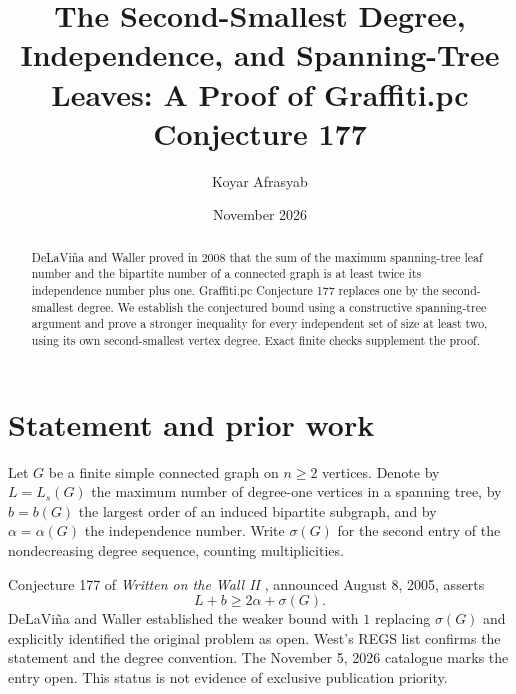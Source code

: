 \documentclass[11pt,a4paper]{article}
\title{The Second-Smallest Degree, Independence, and Spanning-Tree Leaves: A Proof of Graffiti.pc Conjecture 177}
\author{Koyar Afrasyab}
\date{November 2026}
\begin{document}
\maketitle
\begin{abstract}
DeLaVi\~na and Waller proved in 2008 that the sum of the maximum spanning-tree leaf number and the bipartite number of a connected graph is at least twice its independence number plus one. Graffiti.pc Conjecture 177 replaces one by the second-smallest degree. We establish the conjectured bound using a constructive spanning-tree argument and prove a stronger inequality for every independent set of size at least two, using its own second-smallest vertex degree. Exact finite checks supplement the proof.
\end{abstract}
\section{Statement and prior work}
Let $G$ be a finite simple connected graph on $n\ge2$ vertices. Denote by $L=L_s(G)$ the maximum number of degree-one vertices in a spanning tree, by $b=b(G)$ the largest order of an induced bipartite subgraph, and by $\alpha=\alpha(G)$ the independence number. Write $\sigma(G)$ for the second entry of the nondecreasing degree sequence, counting multiplicities.

Conjecture 177 of \emph{Written on the Wall II} \cite{wow}, announced August 8, 2005, asserts
\[
L+b\ge 2\alpha+\sigma(G).
\]
DeLaVi\~na and Waller \cite[Theorem 3]{dw} established the weaker bound with $1$ replacing $\sigma(G)$ and explicitly identified the original problem as open. West's REGS list \cite{west} confirms the statement and the degree convention. The November 5, 2026 catalogue marks the entry open. This status is not evidence of exclusive publication priority.
\end{document}
